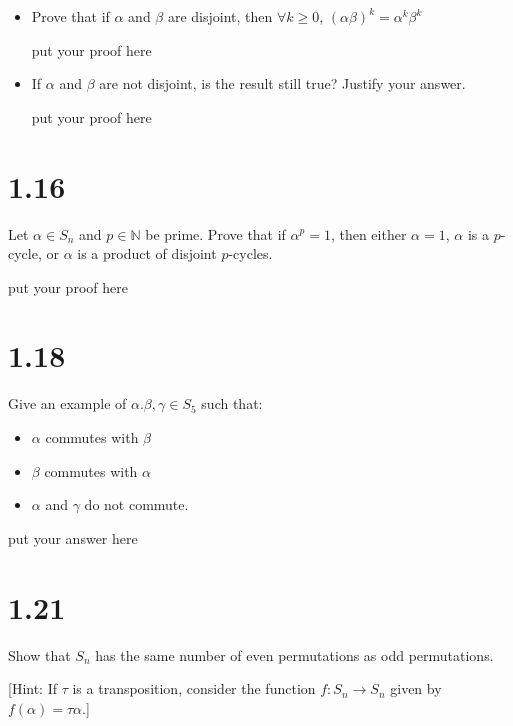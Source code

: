 \documentclass[12pt]{article}
\begin{document}
\begin{itemize}
	\item Prove that if $\alpha$ and $\beta$ are disjoint, then $\forall k\ge0$, $(\alpha\beta)^k=\alpha^k\beta^k$

	\bigskip

	put your proof here

	\vspace{1in}

\item If $\alpha$ and $\beta$ are not disjoint, is the result still true? Justify your answer.

	\bigskip

	put your proof here

	\vspace{1in}

\end{itemize}

\section*{1.16} Let $\alpha\in S_n$ and $p\in \mathbb{N}$ be prime. Prove that if $\alpha^p=1$, then either $\alpha=1$, $\alpha$ is a $p$-cycle, or $\alpha$ is a product of disjoint $p$-cycles.

	\bigskip

	put your proof here

	\vspace{1in}

\section*{1.18} Give an example of $\alpha. \beta, \gamma\in S_5$ such that:
\begin{itemize}
	\item $\alpha$ commutes with $\beta$
	\item $\beta$ commutes with $\alpha$
	\item $\alpha$ and $\gamma$ do not commute.
\end{itemize}

\bigskip

	put your answer here

	\vspace{1in}

\section*{1.21} Show that $S_n$ has the same number of even permutations as odd permutations.

[Hint: If $\tau$ is a transposition, consider the function $f : S_n\to S_n$ given by $f(\alpha)=\tau\alpha$.]
\end{document}
